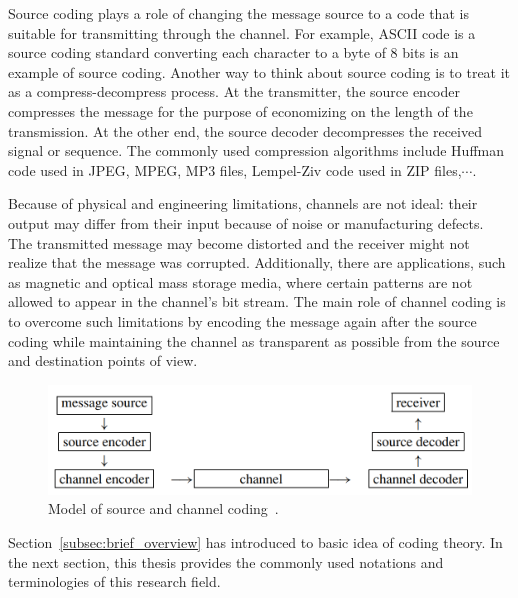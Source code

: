 Source coding plays a role of changing the message source to a code that is suitable for transmitting through the channel. For example, ASCII code is a source coding standard converting each character to a byte of 8 bits is an example of source coding. Another way to think about source coding is to treat it as a compress-decompress process. At the transmitter, the source encoder compresses the message for the purpose of economizing on the length of the transmission. At the other end, the source decoder decompresses the received signal or sequence. The commonly used compression algorithms include Huffman code used in JPEG, MPEG, MP3 files, Lempel-Ziv code used in ZIP files,$\cdots$.

Because of physical and engineering limitations, channels are not ideal: their output may differ from their input because of noise or manufacturing defects. The transmitted message may become distorted and the receiver might not realize that the message was corrupted. Additionally, there are applications, such as magnetic and optical mass storage media, where certain patterns are not allowed to appear in the channel's bit stream. The main role of channel coding is to overcome such limitations by encoding the message again after the source coding while maintaining the channel as transparent as possible from the source and destination points of view. 

\begin{figure}
    \centering
    \includegraphics[scale=0.5]{fig/sourceandchannelcoding.png}
    \caption{Model of source and channel coding~\cite{ling2004coding}.}
    \label{fig:sourcechannelcoding}
\end{figure}

Section~\ref{subsec:brief_overview} has introduced to basic idea of coding theory. In the next section, this thesis provides the commonly used notations and terminologies of this research field.
